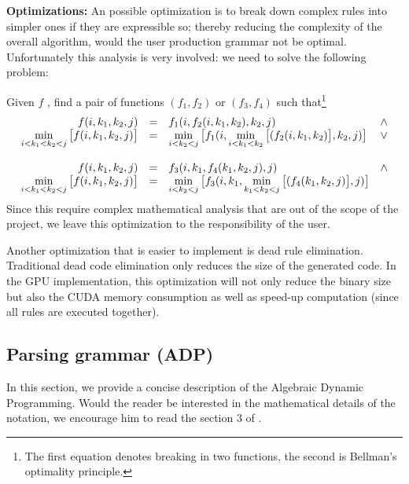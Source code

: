 \item \textbf{Optimizations:} An possible optimization is to break down complex rules into simpler ones if they are expressible so; thereby reducing the complexity of the overall algorithm, would the user production grammar not be optimal. Unfortunately this analysis is very involved: we need to solve the following problem:

Given $f$ , find a pair of functions $(f_1,f_2)$ or $(f_3,f_4)$ such that\footnote{The first equation denotes breaking in two functions, the second is Bellman's optimality principle.}
\[\begin{array}{rcll}
f(i,k_1,k_2,j) &=& f_1(i,f_2(i,k_1,k_2),k_2,j) & \land \\
	\min\limits_{i<k_1<k_2<j}\big[ f(i,k_1,k_2,j) \big] &=& \min\limits_{i<k_2<j} \big[ f_1(i,\min\limits_{i<k_1<k_2} \big[ (f_2(i,k_1,k_2  ) \big],k_2,j) \big] & \lor \vspace{12pt} \\
f(i,k_1,k_2,j) &=& f_3(i,k_1,f_4(k_1,k_2,j),j) & \land \\
	\min\limits_{i<k_1<k_2<j}\big[ f(i,k_1,k_2,j) \big] &=& \min\limits_{i<k_2<j} \big[ f_3(i,k_1,\min\limits_{k_1<k_2<j} \big[ (f_4(k_1,k_2,j) \big],j) \big]
\end{array}\]
Since this require complex mathematical analysis that are out of the scope of the project, we leave this optimization to the responsibility of the user.

Another optimization that is easier to implement is dead rule elimination. Traditional dead code elimination only reduces the size of the generated code. In the GPU implementation, this optimization will not only reduce the binary size but also the CUDA memory consumption as well as speed-up computation (since all rules are executed together).
\ule

\newpage
\subsection{Parsing grammar (ADP)} \label{adp_grammar}
In this section, we provide a concise description of the Algebraic Dynamic Programming. Would the reader be interested in the mathematical details of the notation, we encourage him to read the section 3 of \cite{adp}.

